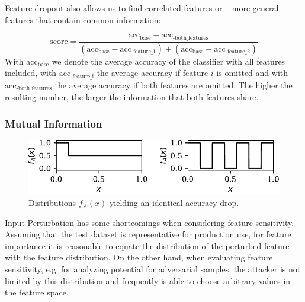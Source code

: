 \documentclass[conference]{IEEEtran}
\begin{document}
Feature dropout also allows us to find correlated features or -- more general -- features that contain common information: 

\begin{equation}
\text{score} = \frac{\text{acc}_\text{base}-\text{acc}_\text{-both\_features}}{\left(\text{acc}_\text{base}-\text{acc}_\text{-feature\_1}\right) + \left(\text{acc}_\text{base}-\text{acc}_\text{-feature\_2}\right)}
\end{equation}
With $\text{acc}_\text{base}$ we denote the average accuracy of the classifier with all features included, with $\text{acc}_\text{-feature\_i}$ the average accuracy if feature $i$ is omitted and with $\text{acc}_\text{-both\_features}$ the average accuracy if both features are omitted. The higher the resulting number, the larger the information that both features share. 

\subsubsection{Mutual Information}
\begin{figure}
\includegraphics[width=\columnwidth]{../plots/mutinfo_example.pdf}
\caption{Distributions $f_A(x)$ yielding an identical accuracy drop.}
\label{fig:mutinfo_example}
\end{figure}
Input Perturbation has some shortcomings when considering feature sensitivity. Assuming that the test dataset is representative for production use, for feature importance it is reasonable to equate the distribution of the perturbed feature with the feature distribution. On the other hand, when evaluating feature sensitivity, e.g. for analyzing potential for adversarial samples, the attacker is not limited by this distribution and frequently is able to choose arbitrary values in the feature space.
\end{document}
